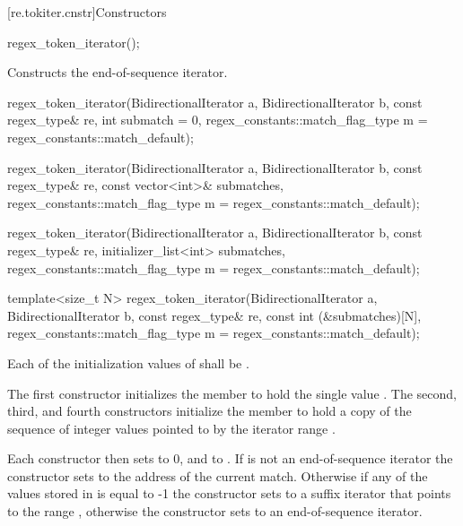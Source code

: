 [re.tokiter.cnstr]{Constructors}

%
\begin{itemdecl}
regex_token_iterator();
\end{itemdecl}

\begin{itemdescr}
\pnum
\effects  Constructs the end-of-sequence iterator.
\end{itemdescr}

%
\begin{itemdecl}
regex_token_iterator(BidirectionalIterator a, BidirectionalIterator b,
                     const regex_type& re,
                     int submatch = 0,
                     regex_constants::match_flag_type m = regex_constants::match_default);

regex_token_iterator(BidirectionalIterator a, BidirectionalIterator b,
                     const regex_type& re,
                     const vector<int>& submatches,
                     regex_constants::match_flag_type m = regex_constants::match_default);

regex_token_iterator(BidirectionalIterator a, BidirectionalIterator b,
                     const regex_type& re,
                     initializer_list<int> submatches,
                     regex_constants::match_flag_type m = regex_constants::match_default);

template<size_t N>
  regex_token_iterator(BidirectionalIterator a, BidirectionalIterator b,
                       const regex_type& re,
                       const int (&submatches)[N],
                       regex_constants::match_flag_type m = regex_constants::match_default);
\end{itemdecl}

\begin{itemdescr}
\pnum
\requires Each of the initialization values of  shall be
.

\pnum
\effects The first constructor initializes the member  to hold the single
value .
The second, third, and fourth constructors
initialize the member  to hold a copy of the sequence of integer values
pointed to by the iterator range
.

\pnum
Each constructor then sets  to 0, and  to
. If  is not an
end-of-sequence iterator the constructor sets  to the
address of the current match. Otherwise if any of the values stored
in  is equal to -1 the constructor sets  to a suffix
iterator that points to the range , otherwise the constructor
sets  to an end-of-sequence iterator.
\end{itemdescr}

